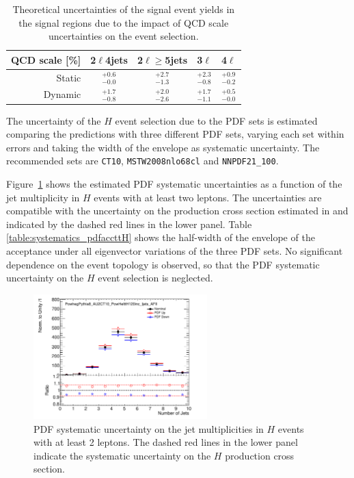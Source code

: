 \begin{table}
\caption{Theoretical uncertainties of the signal event yields in the signal regions due to the impact of QCD scale uncertainties on the event selection.}
\begin{center} 
\begin{tabular}{r|c|c|c|c|}
QCD scale [\%] & 2$\ell$4jets & 2$\ell$$\geq$5jets & 3$\ell$ & 4$\ell$ \\
\hline
Static   & $^{+0.6}_{-0.0}$ & $^{+2.7}_{-1.3}$ & $^{+2.3}_{-0.8}$ & $^{+0.9}_{-0.2}$ \\
Dynamic  & $^{+1.7}_{-0.8}$ & $^{+2.0}_{-2.6}$ & $^{+1.7}_{-1.1}$ & $^{+0.5}_{-0.0}$ \\
\hline
\end{tabular}
\end{center}
\label{table:systematics_theosystttH}
\end{table}%

The uncertainty of the \ttbar$H$ event selection due to the PDF sets is estimated comparing the predictions with three different PDF sets, varying each set within errors and taking the width of the envelope as systematic uncertainty. The recommended sets are \verb+CT10+, \verb+MSTW2008nlo68cl+ and \verb+NNPDF21_100+. 

Figure~\ref{figure:systematics_theosystPDF} shows the estimated PDF systematic uncertainties as a function of the jet multiplicity in \ttbar$H$ events with at least two leptons. The uncertainties are compatible with the uncertainty on the production cross section estimated in \cite{Heinemeyer:2013tqa} and indicated by the dashed red lines in the lower panel. 
Table \ref{table:systematics_pdfaccttH} shows the half-width of the envelope of the acceptance under all eigenvector variations of the three PDF sets.
No significant dependence on the event topology is observed, so that the PDF systematic uncertainty on the \ttbar$H$ event selection is neglected.
\begin{figure}[htbp]
\begin{center}
\includegraphics[width=0.6\textwidth]{figs/tth/plot_PowhegPythia8_AU2CT10_PowHelttH120inc_ljets_AFII_njets_all_njets_all}
\caption{PDF systematic uncertainty on the jet multiplicities in \ttbar$H$ events with at least 2 leptons. The dashed red lines in the lower panel indicate the systematic uncertainty on the \ttbar$H$ production cross section.}
\label{figure:systematics_theosystPDF}
\end{center}
\end{figure}


